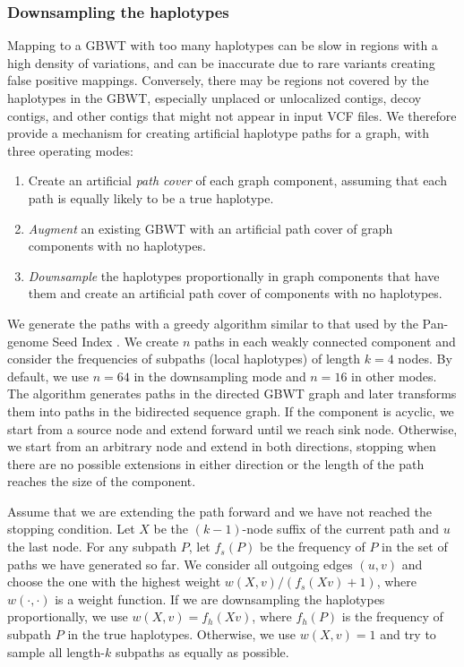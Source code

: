 \documentclass[11pt]{ucscthesis}
\newcommand{\vocab}[1]{\emph{#1}}
\begin{document}
\subsubsection{Downsampling the haplotypes}
\label{subsec:aim2:downsampling}

Mapping to a GBWT with too many haplotypes can be slow in regions with a high density of variations, and can be inaccurate due to rare variants creating false positive mappings.
Conversely, there may be regions not covered by the haplotypes in the GBWT, especially unplaced or unlocalized contigs, decoy contigs, and other contigs that might not appear in input VCF files.
We therefore provide a mechanism for creating artificial haplotype paths for a graph, with three operating modes:
\begin{enumerate}
    \item Create an artificial \vocab{path cover} of each graph component, assuming that each path is equally likely to be a true haplotype.
    \item \vocab{Augment} an existing GBWT with an artificial path cover of graph components with no haplotypes.
    \item \vocab{Downsample} the haplotypes proportionally in graph components that have them and create an artificial path cover of components with no haplotypes.
\end{enumerate}

We generate the paths with a greedy algorithm similar to that used by the Pan-genome Seed Index \cite{Ghaffaari2019}.
We create $n$ paths in each weakly connected component and consider the frequencies of subpaths (local haplotypes) of length $k = 4$ nodes.
By default, we use $n = 64$ in the downsampling mode and $n = 16$ in other modes.
The algorithm generates paths in the directed GBWT graph and later transforms them into paths in the bidirected sequence graph.
If the component is acyclic, we start from a source node and extend forward until we reach sink node.
Otherwise, we start from an arbitrary node and extend in both directions, stopping when there are no possible extensions in either direction or the length of the path reaches the size of the component.

Assume that we are extending the path forward and we have not reached the stopping condition.
Let $X$ be the $(k-1)$-node suffix of the current path and $u$ the last node.
For any subpath $P$, let $f_{s}(P)$ be the frequency of $P$ in the set of paths we have generated so far.
We consider all outgoing edges $(u, v)$ and choose the one with the highest weight $w(X, v) / (f_{s}(Xv) + 1)$, where $w(\cdot, \cdot)$ is a weight function.
If we are downsampling the haplotypes proportionally, we use $w(X, v) = f_{h}(Xv)$, where $f_{h}(P)$ is the frequency of subpath $P$ in the true haplotypes.
Otherwise, we use $w(X, v) = 1$ and try to sample all length-$k$ subpaths as equally as possible.
\end{document}
